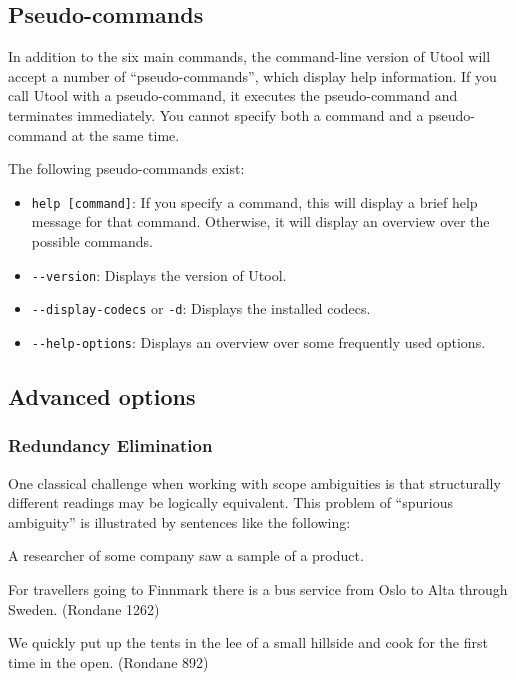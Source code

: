 \subsection{Pseudo-commands}

In addition to the six main commands, the command-line version of
Utool will accept a number of ``pseudo-commands'', which display help
information. If you call Utool with a pseudo-command, it executes the
pseudo-command and terminates immediately. You cannot specify both a
command and a pseudo-command at the same time.

The following pseudo-commands exist:

\begin{itemize}
\item \verb?help [command]?: If you specify a command, this will
display a brief help message for that command. Otherwise, it will
display an overview over the possible commands.
\item \verb?--version?: Displays the version of Utool.
\item \verb?--display-codecs? or \verb?-d?: Displays the installed
codecs.
\item \verb?--help-options?: Displays an overview over some frequently
used options.
\end{itemize}




\subsection{Advanced options}

\subsubsection{Redundancy Elimination} \label{sec:redund-elim}

One classical challenge when working with scope ambiguities is that
structurally different readings may be logically equivalent. This
problem of ``spurious ambiguity'' is illustrated by sentences like the
following:

\begin{examples}
\item \label{ex:spurious}
A researcher of some company saw a sample of a product.
\item
  \label{ex:rondane-1262} 
  For travellers going to Finnmark there is a bus service from Oslo to
  Alta through Sweden. (Rondane 1262)
\item 
  \label{ex:rondane-892}
  We quickly put up the tents in the lee of a small hillside and cook
  for the first time in the open. (Rondane 892)
\end{examples}


